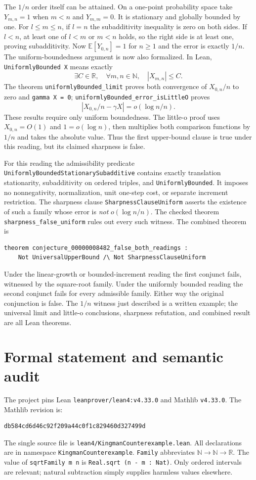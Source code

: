 \documentclass[11pt]{article}
\begin{document}
The $1/n$ order itself can be attained. On a one-point probability space
take $Y_{m,n}=1$ when $m<n$ and $Y_{m,m}=0$. It is stationary and globally
bounded by one. For $l\le m\le n$, if $l=n$ the subadditivity inequality
is zero on both sides. If $l<n$, at least one of $l<m$ or $m<n$ holds,
so the right side is at least one, proving subadditivity. Now
$\mathbb E[Y_{0,n}]=1$ for $n\ge1$ and the error is exactly $1/n$.
The uniform-boundedness argument is now also formalized. In Lean,
\texttt{UniformlyBounded X} means exactly
\[
\exists C\in\mathbb R,\quad \forall m,n\in\mathbb N,\quad |X_{m,n}|\le C.
\]
The theorem \texttt{uniformlyBounded\_limit} proves both convergence of
$X_{0,n}/n$ to zero and \texttt{gamma X = 0};
\texttt{uniformlyBounded\_error\_isLittleO} proves
\[
\left|X_{0,n}/n-\gamma X\right|=o(\log n/n).
\]
These results require only uniform boundedness. The little-o proof uses
$X_{0,n}=O(1)$ and $1=o(\log n)$, then multiplies both comparison functions
by $1/n$ and takes the absolute value. Thus the first upper-bound clause
is true under this reading, but its claimed sharpness is false.

For this reading the admissibility predicate
\texttt{UniformlyBoundedStationarySubadditive} contains exactly translation
stationarity, subadditivity on ordered triples, and
\texttt{UniformlyBounded}. It imposes no nonnegativity, normalization,
unit one-step cost, or separate increment restriction. The sharpness
clause \texttt{SharpnessClauseUniform} asserts the existence of such a
family whose error is \emph{not} $o(\log n/n)$.
The checked theorem \texttt{sharpness\_false\_uniform} rules out every such
witness. The combined theorem is
\begin{lstlisting}
theorem conjecture_00000008482_false_both_readings :
    Not UniversalUpperBound /\ Not SharpnessClauseUniform
\end{lstlisting}
Under the linear-growth or bounded-increment reading the first conjunct
fails, witnessed by the square-root family. Under the uniformly bounded
reading the second conjunct fails for every admissible family. Either way
the original conjunction is false. The $1/n$ witness just described is a
written example; the universal limit and little-o conclusions, sharpness
refutation, and combined result are all Lean theorems.

\section{Formal statement and semantic audit}
The project pins Lean \texttt{leanprover/lean4:v4.33.0} and Mathlib
\texttt{v4.33.0}. The Mathlib revision is:
\begin{lstlisting}
db584cd6d46c92f209a44c0f1c829460d327499d
\end{lstlisting}
The single source file is \texttt{lean4/KingmanCounterexample.lean}.
All declarations are in namespace \texttt{KingmanCounterexample}.
\texttt{Family} abbreviates $\mathbb N\to\mathbb N\to\mathbb R$.
The value of \texttt{sqrtFamily m n} is
\texttt{Real.sqrt (n - m : Nat)}. Only ordered intervals are relevant;
natural subtraction simply supplies harmless values elsewhere.
\end{document}
